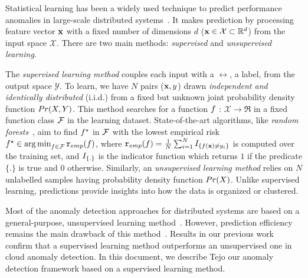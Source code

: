 Statistical learning has been a widely used technique to predict performance anomalies in large-scale distributed systems~\cite{chandola2009anomaly}. It makes prediction by processing feature vector ${\bf x}$ with a fixed
  number of dimensions $d$ (${\bf x} \in {\cal X} \subset \mathbb{R}^d$) from the input space $\mathcal{X}$. There are two main methods: \emph{supervised} and \emph{unsupervised learning}. 

The \emph{supervised learning method} couples each input with a $\rel$, a label, from the output space  $\mathcal{Y}$. To learn, we have $N$ pairs (${\bf x},y$) drawn \emph{independent and identically distributed} (i.i.d.) from a fixed but unknown joint probability density function ${Pr(X,Y)}$. This method searches for a function $f$ : $\mathcal{X} \rightarrow \Re$  in a fixed function class ${\cal F}$ in the learning dataset. State-of-the-art algorithms, like \emph{random forests}~\cite{breiman2001random}, aim to find $f^\star$ in ${\cal F}$ with the lowest empirical risk $f^\star \in \operatorname*{arg\,min}_{f \in {\cal F}} {\tt r}_{emp}(f)$,
where ${\tt r}_{emp}(f) = \frac{1}{N} \sum_{i=1}^N I_{\left \{ f({\bf x}) \neq y_i \right \}}$ is computed over the training set, and $I_{\left \{ . \right \}}$ is the indicator function which returns $1$ if the predicate $\{.\}$ is true and $0$ otherwise. Similarly, an \emph{unsupervised learning method} relies on $N$ unlabelled samples having probability density function ${Pr(X)}$. Unlike supervised learning, predictions provide insights into how the data is organized or clustered.

Most of the anomaly detection approaches for distributed systems are based on a general-purpose, unsupervised learning method~\cite{gujrati2007meta,lan2010toward,guan2013adaptive}. However, prediction efficiency remains the main drawback of this method~\cite{love2002comparing}. Results in our previous work~\cite{silvestre2014anomaly} confirm that a supervised learning method outperforms an unsupervised one in cloud anomaly detection. In this document, we describe Tejo our anomaly detection framework based on a supervised learning method.
